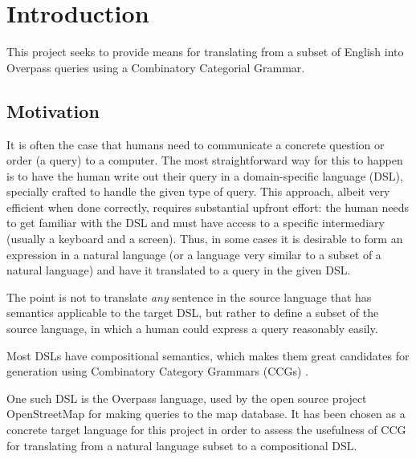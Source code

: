 \documentclass[main.tex]{subfiles}
\begin{document}
\section{Introduction}
This project seeks to provide means for translating from a subset of English
into Overpass queries using a Combinatory Categorial Grammar.

\subsection{Motivation}
It is often the case that humans need to communicate a concrete question
or order (a query) to a computer. The most straightforward way for this to happen is
to have the human write out their query in a domain-specific language (DSL),
specially crafted to handle the given type of query. This approach, albeit
very efficient when done correctly, requires substantial upfront effort:
the human needs to get familiar with the DSL and must have access to a specific
intermediary
(usually a keyboard and a screen). Thus, in some cases it is desirable
to form an expression in a natural language (or a language very similar to a
subset of a natural language) and have it translated to a query in the given
DSL.

The point is not to translate \emph{any} sentence in the source language
that has semantics applicable to the target DSL, but rather to define a
subset of the source language, in which a human could express a query
reasonably easily.

Most DSLs have compositional semantics, which makes them great candidates
for generation using Combinatory Category Grammars (CCGs) \cite[p.~181]{nts}.

One such DSL is the Overpass language, used by the open source project
OpenStreetMap for making queries to the map database. It has been chosen as
a concrete target language for this project in order to assess the usefulness
of CCG for translating from a natural language subset to a compositional
DSL.
\end{document}
